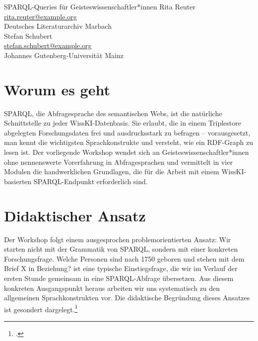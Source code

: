 \graphicspath{{abstracts/workshops/03-sparql-queries/img/}{img/}}

\begin{beitrag}{SPARQL-Queries für Geisteswissenschaftler*innen}{%
Rita Reuter\, \\
\small \href{mailto:rita.reuter@example.org}{rita.reuter@example.org} \\
\small Deutsches Literaturarchiv Marbach \\[0.5cm]
Stefan Schubert\, \\
\small \href{mailto:stefan.schubert@example.org}{stefan.schubert@example.org} \\
\small Johannes Gutenberg-Universität Mainz
}

\begin{abstract}
Der Workshop vermittelt Geisteswissenschaftler*innen ohne Vorerfahrung die handwerklichen Grundlagen von SPARQL für WissKI-basierte Forschungsdaten: In vier problemorientierten Modulen werden ausgehend von konkreten Forschungsfragen SELECT-Abfragen, Filterung und Aggregation (einschließlich geisteswissenschaftlicher Datierungen) sowie die Verknüpfung mit externen Quellen über SERVICE und OPTIONAL erarbeitet. Als Arbeitsumgebung dient die frei verfügbare YASGUI-Oberfläche an öffentlich zugänglichen Endpunkten; Ziel ist das konzeptuelle Verständnis dessen, was eine SPARQL-Abfrage leistet und worin sie sich von einer Volltextsuche unterscheidet -- nicht die Beherrschung jedes einzelnen Sprachkonstrukts.
\end{abstract}

\section{Worum es geht}
SPARQL, die Abfragesprache des semantischen Webs, ist die natürliche Schnittstelle zu jeder WissKI-Datenbasis. Sie erlaubt, die in einem Triplestore abgelegten Forschungsdaten frei und ausdrucksstark zu befragen -- vorausgesetzt, man kennt die wichtigsten Sprachkonstrukte und versteht, wie ein RDF-Graph zu \glqq lesen\grqq{} ist. Der vorliegende Workshop wendet sich an Geisteswissenschaftler*innen ohne nennenswerte Vorerfahrung in Abfragesprachen und vermittelt in vier Modulen die handwerklichen Grundlagen, die für die Arbeit mit einem WissKI-basierten SPARQL-Endpunkt erforderlich sind.

\section{Didaktischer Ansatz}
Der Workshop folgt einem ausgesprochen problemorientierten Ansatz: Wir starten nicht mit der Grammatik von SPARQL, sondern mit einer konkreten Forschungsfrage. \glqq Welche Personen sind nach 1750 geboren und stehen mit dem Brief X in Beziehung?\grqq{} ist eine typische Einstiegsfrage, die wir im Verlauf der ersten Stunde gemeinsam in eine SPARQL-Abfrage übersetzen. Aus diesem konkreten Ausgangspunkt heraus arbeiten wir uns systematisch zu den allgemeinen Sprachkonstrukten vor. Die didaktische Begründung dieses Ansatzes ist gesondert dargelegt.\footcite[46]{reuter2024-sparql-didaktik}


\end{beitrag}
